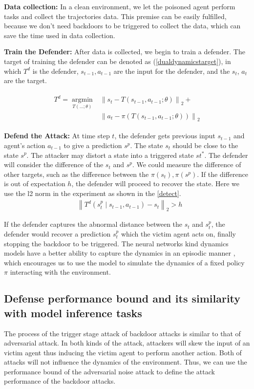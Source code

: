 \documentclass[letterpaper, 10 pt, conference]{ieeeconf}  %
\begin{document}
\textbf{Data collection:}
In a clean environment, we let the poisoned agent perform tasks and collect the trajectories data. This premise can be easily fulfilled, because we don't need backdoors to be triggered to collect the data, which can save the time used in data collection. 

\textbf{Train the Defender:}
After data is collected, we begin to train a defender. The target of training the defender can be denoted as  (\ref{dualdynamicstarget}), in which $T^d$ is the defender, $s_{t-1},a_{t-1}$ are the input for the defender, and the $s_t$, $a_t$ are the target.

\begin{eqnarray}
\label{dualdynamicstarget}
\begin{aligned}
T^d=\underset{T(\ldots;\theta)}{\operatorname{argmin}}&\left\|s_t-T\left(s_{t-1}, a_{t-1};\theta\right)\right\|_2+\\&\left\|a_t-\pi(T\left(s_{t-1}, a_{t-1};\theta\right))\right\|_2
\end{aligned}
\end{eqnarray}



\textbf{Defend the Attack:}
At time step $t$, the defender gets previous input $s_{t-1}$ and agent’s action $a_{t-1}$ to give a prediction $s^p$. The state $s_t$ should be close to the state $s^p$. The attacker may distort a state into a triggered state $st^*$. The defender will consider the difference of the $s_t$ and $s^p$. We could measure the difference of other targets, such as the difference between the $\pi(s_t),\pi(s^p)$. If the difference is out of expectation $h$, the defender will proceed to recover the state. Here we use the l2 norm in the experiment as shown in the \ref{detect}.
\begin{eqnarray}
\label{detect}&\left\|T^d(s_t^p \mid s_{t-1}, a_{t-1})-s_{t}\right\|_2>h
\end{eqnarray}

If the defender captures the abnormal distance between the $s_{t}$ and $s_t^p$, the defender would recover a prediction $s_t^p$ which the victim agent acts on, finally stopping the backdoor to be triggered. The neural networks kind dynamics models have a better ability to capture the dynamics in an episodic manner \cite{GlobalOptimalControl, lambert2021learning}, which encourages us to use the model to simulate the dynamics of a fixed policy $\pi$ interacting with the environment.
\subsection{Defense performance bound and its similarity with model inference tasks}
The process of the trigger stage attack of backdoor attacks is similar to that of adversarial attack. In both kinds of the attack, attackers will skew the input of an victim agent thus inducing the victim agent to perform another action. Both of attacks will not influence the dynamics of the environment. Thus, we can use the performance bound of the adversarial noise attack to define the attack performance of the backdoor attacks.
\end{document}
